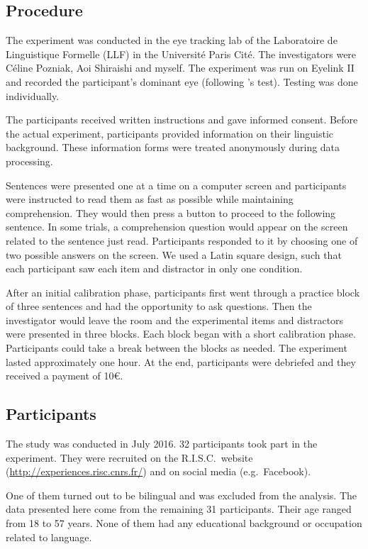 \subsection{Procedure}

The experiment was conducted in the eye tracking lab of the Laboratoire de Linguistique Formelle (LLF) in the Université Paris Cité. The investigators were Céline Pozniak, Aoi Shiraishi and myself. The experiment was run on Eyelink II and recorded the participant's dominant eye (following \citeauthor{Miles.1930}'s \citeyear{Miles.1930} test). Testing was done individually.

The participants received written instructions and gave informed consent. Before the actual experiment, participants provided information on their linguistic background. These information forms were treated anonymously during data processing.

Sentences were presented one at a time on a computer screen and participants were instructed to read them as fast as possible while maintaining comprehension.
They would then press a button to proceed to the following sentence. 
In some trials, a comprehension question would appear on the screen related to the sentence just read. Participants responded to it by choosing one of two possible answers on the screen. 
We used a Latin square design, such that each participant saw each item and distractor in only one condition.

After an initial calibration phase, participants first went through a practice block of three sentences and had the opportunity to ask questions. Then the investigator would leave the room and the experimental items and distractors were presented in three blocks. 
Each block began with a short calibration phase. Participants could take a break between the blocks as needed. The experiment lasted approximately one hour. At the end, participants were debriefed and they received a payment of 10€.

\subsection{Participants}

The study was conducted in July 2016. 
32 participants took part in the experiment. 
They were recruited on the R.I.S.C.\ website (\url{http://experiences.risc.cnrs.fr/}) and on social media (e.g.\ Facebook).

One of them turned out to be bilingual and was excluded from the analysis.  The data presented here come from the remaining 31 participants. 
Their age ranged from 18 to 57 years. None of them had any educational background or occupation related to language.

